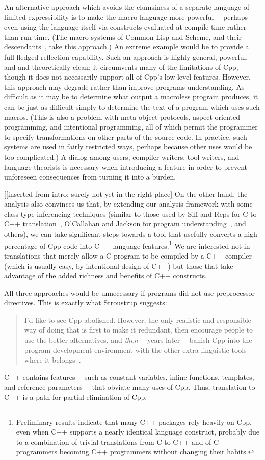 \documentclass[11pt]{article}
\begin{document}
An alternative approach which avoids the clumsiness of a separate language
of limited expressibility is to make the macro language more
powerful\,---\,perhaps even using the language itself via constructs
evaluated at compile time rather than run time.  (The macro systems of
Common Lisp and Scheme, and their descendants~\cite{WeiseC93}, take this
approach.)  An extreme example would be to provide a full-fledged
reflection capability.  Such an approach is highly general, powerful, and
and theoretically clean; it circumvents many of the limitations of Cpp,
though it does not necessarily support all of Cpp's low-level features.
However, this approach may degrade rather than improve programs
understanding.  As difficult as it may be to determine what output a
macroless program produces, it can be just as difficult simply to determine
the text of a program which uses such macros.  (This is also a problem with
meta-object protocols, aspect-oriented programming, and intentional
programming, all of which permit the programmer to specify transformations
on other parts of the source code.  In practice, such systems are used in
fairly restricted ways, perhaps because other uses would be too
complicated.)  A dialog among users, compiler writers, tool writers, and
language theorists is necessary when introducing a feature in order to
prevent unforeseen consequences from turning it into a burden.


[[inserted from intro: surely not yet in the right place]
On the other hand, the analysis also
convinces us that, by extending our analysis framework with some class
type inferencing techniques (similar to those used by Siff and Reps
for C to C++ translation~\cite{Siff-fse96}, O'Callahan and Jackson for
program understanding~\cite{OCallahan-icse97}, and others), we can
take significant steps towards a tool that usefully converts a high
percentage of Cpp code into C++ language
features.\footnote{Preliminary results indicate that many C++ packages
rely heavily on Cpp, even when C++ supports a nearly identical
language construct, probably due to a combination of trivial
translations from C to C++ and of C programmers becoming C++
programmers without changing their habits.} We are interested not in
translations that merely allow a C program to be compiled by a C++
compiler (which is usually easy, by intentional design of C++) but
those that take advantage of the added richness and benefits of C++
constructs.

All three approaches would be unnecessary if programs did not use
preprocessor directives.  This is exactly what Stroustrup suggests:
\begin{quote}
  I'd like to see Cpp abolished.  However, the only realistic and
  responsible way of doing that is first to make it redundant, then
  encourage people to use the better alternatives, and {\em then\/}\,---\,years
  later\,---\,banish Cpp into the program development environment with the
  other extra-linguistic tools where it
  belongs~\cite[p.~426]{Stroustrup-DesignEvolution}.
\end{quote}
C++ contains features\,---\,such as constant variables, inline functions,
templates, and reference parameters\,---\,that obviate many uses of Cpp.
Thus, translation to C++ is a path for partial elimination of Cpp.
\end{document}
